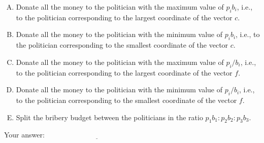 \documentclass[10pt]{amsart}
\begin{document}
\begin{enumerate}
  \begin{enumerate}[(A)]
  \item Donate all the money to the politician with the maximum value
    of $p_ib_i$, i.e., to the politician corresponding to the largest
    coordinate of the vector $c$.
  \item Donate all the money to the politician with the minimum value
    of $p_ib_i$, i.e., to the politician corresponding to the smallest
    coordinate of the vector $c$.
  \item Donate all the money to the politician with the maximum value
    of $p_i/b_i$, i.e., to the politician corresponding to the largest
    coordinate of the vector $f$.
  \item Donate all the money to the politician with the minimum value
    of $p_i/b_i$, i.e., to the politician corresponding to the smallest
    coordinate of the vector $f$.
  \item Split the bribery budget between the politicians in the ratio
    $p_1b_1:p_2b_2:p_3b_3$.
  \end{enumerate}

  \vspace{0.1in}
  Your answer: $\underline{\qquad\qquad\qquad\qquad\qquad\qquad\qquad}$
  \vspace{0.1in}

\end{enumerate}
\end{document}

